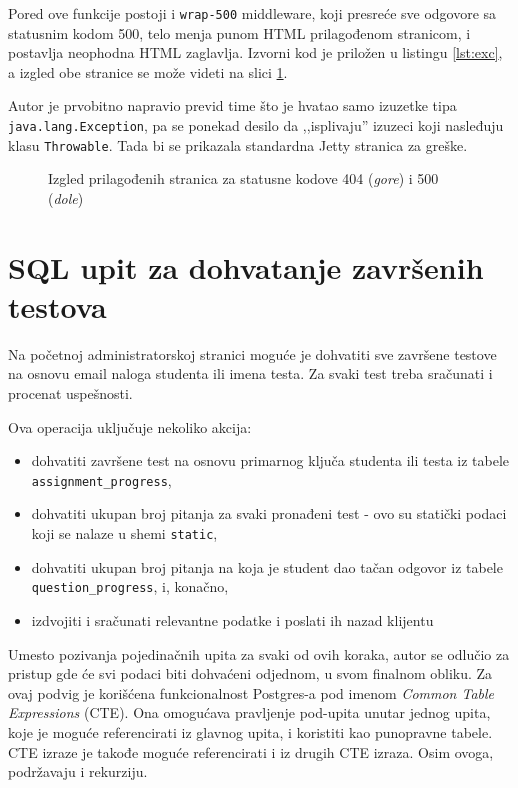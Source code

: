 {Pored ove funkcije postoji i \texttt{wrap-500} middleware, koji presreće sve odgovore sa statusnim kodom 500, telo menja punom HTML prilagođenom stranicom, i postavlja neophodna HTML zaglavlja. Izvorni kod je priložen u listingu \ref{lst:exc}, a izgled obe stranice se može videti na slici \ref{fig:exc}.

Autor je prvobitno napravio previd time što je hvatao samo izuzetke tipa \texttt{java.lang.Exception}, pa se ponekad desilo da ,,isplivaju'' izuzeci koji nasleđuju klasu \texttt{Throwable}. Tada bi se prikazala standardna Jetty stranica za greške.
\begin{figure}[hb]
\centering
\fbox{\texttt{[image: 404]}}
\fbox{\texttt{[image: 500]}}
\caption{Izgled prilagođenih stranica za statusne kodove 404 (\textit{gore}) i 500 (\textit{dole})}
\label{fig:exc}
\end{figure}

\section{SQL upit za dohvatanje završenih testova}
Na početnoj administratorskoj stranici moguće je dohvatiti sve završene testove na osnovu email naloga studenta ili imena testa. Za svaki test treba sračunati i procenat uspešnosti.

Ova operacija uključuje nekoliko akcija:
\begin{itemize}
\item dohvatiti završene test na osnovu primarnog ključa studenta ili testa iz tabele \texttt{assignment\_progress},
\item dohvatiti ukupan broj pitanja za svaki pronađeni test - ovo su statički podaci koji se nalaze u shemi \texttt{static},
\item dohvatiti ukupan broj pitanja na koja je student dao tačan odgovor iz tabele \texttt{question\_progress}, i, konačno,
\item izdvojiti i sračunati relevantne podatke i poslati ih nazad klijentu
\end{itemize}


Umesto pozivanja pojedinačnih upita za svaki od ovih koraka, autor se odlučio za pristup gde će svi podaci biti dohvaćeni odjednom, u svom finalnom obliku. Za ovaj podvig je korišćena funkcionalnost Postgres-a pod imenom \textit{Common Table Expressions} (CTE). Ona omogućava pravljenje pod-upita unutar jednog upita, koje je moguće referencirati iz glavnog upita, i koristiti kao punopravne tabele. CTE izraze je takođe moguće referencirati i iz drugih CTE izraza. Osim ovoga, podržavaju i rekurziju.

}
